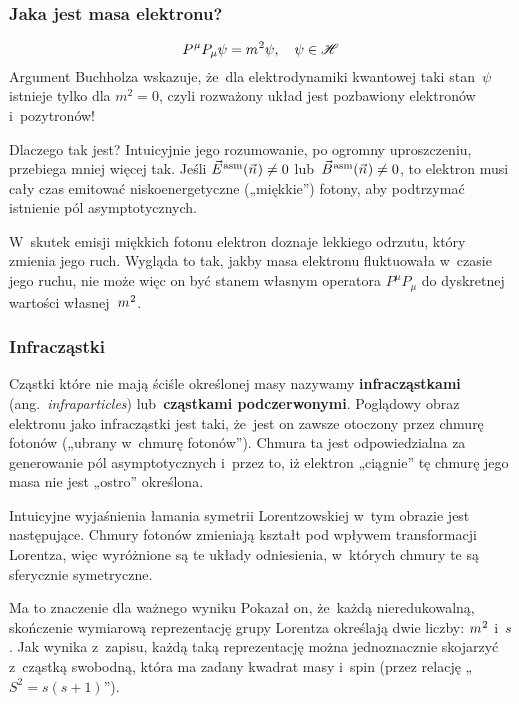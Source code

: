 \documentclass[10pt,t]{beamer}
\begin{document}
\begin{frame}
  \frametitle{Jaka jest masa elektronu?}

  \vspace{-1em}


  \begin{equation}
    \label{eq:Glowne-rodzaje-problemow-podczerwonych-13}
    P^{ \hspace{0.05em} \mu } P_{ \mu } \psi  = m^{ \hspace{0.05em} 2 } \psi, \quad
    \psi \in \mathcal{H}
  \end{equation}
  Argument Buchholza wskazuje, że~dla elektrodynamiki kwantowej taki
  stan~$\psi$ istnieje tylko dla $m^{ 2 } = 0$, czyli rozważony układ jest
  pozbawiony elektronów i~pozytronów!

  Dlaczego tak jest? Intuicyjnie jego rozumowanie, po ogromny uproszczeniu,
  przebiega mniej więcej tak. Jeśli $\vec{E}^{ \hspace{0.05em} \text{asm} }( \vec{n} \hspace{0.05em} ) \neq 0$ lub~$\vec{B}^{ \hspace{0.05em} \text{asm} }( \vec{n} \hspace{0.05em} ) \neq 0$, to
  elektron musi cały czas emitować niskoenergetyczne („miękkie”) fotony,
  aby podtrzymać istnienie pól asymptotycznych.

  W~skutek emisji miękkich fotonu elektron doznaje lekkiego odrzutu, który
  zmienia jego ruch. Wygląda to tak, jakby masa elektronu fluktuowała
  w~czasie jego ruchu, nie może więc on być stanem własnym operatora
  $P^{ \mu } P_{ \mu }$ do dyskretnej wartości własnej~$m^{ \hspace{0.05em} 2 }$.

\end{frame}





\begin{frame}
  \frametitle{Infracząstki}


  Cząstki które nie mają ściśle określonej masy nazywamy
  \textbf{infracząstkami} (ang.~\textit{infraparticles})
  lub~\textbf{cząstkami podczerwonymi}. Poglądowy obraz elektronu jako
  infracząstki jest taki, że~jest on zawsze otoczony przez chmurę fotonów
  („ubrany w~chmurę fotonów”). Chmura ta jest odpowiedzialna za generowanie
  pól asymptotycznych i~przez to, iż elektron „ciągnie” tę chmurę jego masa
  nie jest „ostro” określona.

  Intuicyjne wyjaśnienia łamania symetrii Lorentzowskiej w~tym obrazie
  jest następujące. Chmury fotonów zmieniają kształt pod wpływem
  transformacji Lorentza, więc wyróżnione są te układy odniesienia,
  w~których chmury te są sferycznie symetryczne.

  Ma to znaczenie dla ważnego wyniku
  Pokazał on, że~każdą nieredukowalną, skończenie wymiarową reprezentację
  grupy Lorentza określają dwie liczby: $m^{ \hspace{0.05em} 2 }$ i~$s$. Jak
  wynika z~zapisu, każdą taką reprezentację można jednoznacznie skojarzyć
  z~cząstką swobodną, która ma zadany kwadrat masy i~spin (przez relację
  „$S^{ 2 } = s ( s + 1 )$”).

\end{frame}
\end{document}
